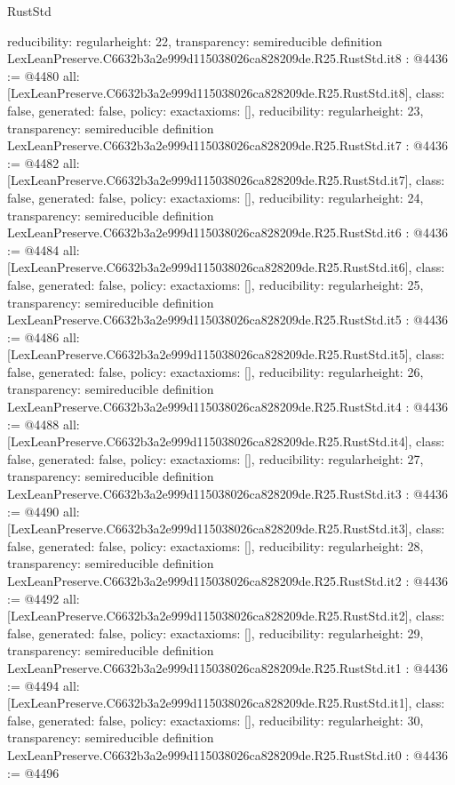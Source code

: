 \begin{lexlean}{RustStd}
\begin{coremodule}
{  reducibility: regular{height: 22},
  transparency: semireducible
}
definition LexLeanPreserve.C6632b3a2e999d115038026ca828209de.R25.RustStd.it8 : @4436 := @4480 {
  all: [LexLeanPreserve.C6632b3a2e999d115038026ca828209de.R25.RustStd.it8],
  class: false,
  generated: false,
  policy: exact{axioms: []},
  reducibility: regular{height: 23},
  transparency: semireducible
}
definition LexLeanPreserve.C6632b3a2e999d115038026ca828209de.R25.RustStd.it7 : @4436 := @4482 {
  all: [LexLeanPreserve.C6632b3a2e999d115038026ca828209de.R25.RustStd.it7],
  class: false,
  generated: false,
  policy: exact{axioms: []},
  reducibility: regular{height: 24},
  transparency: semireducible
}
definition LexLeanPreserve.C6632b3a2e999d115038026ca828209de.R25.RustStd.it6 : @4436 := @4484 {
  all: [LexLeanPreserve.C6632b3a2e999d115038026ca828209de.R25.RustStd.it6],
  class: false,
  generated: false,
  policy: exact{axioms: []},
  reducibility: regular{height: 25},
  transparency: semireducible
}
definition LexLeanPreserve.C6632b3a2e999d115038026ca828209de.R25.RustStd.it5 : @4436 := @4486 {
  all: [LexLeanPreserve.C6632b3a2e999d115038026ca828209de.R25.RustStd.it5],
  class: false,
  generated: false,
  policy: exact{axioms: []},
  reducibility: regular{height: 26},
  transparency: semireducible
}
definition LexLeanPreserve.C6632b3a2e999d115038026ca828209de.R25.RustStd.it4 : @4436 := @4488 {
  all: [LexLeanPreserve.C6632b3a2e999d115038026ca828209de.R25.RustStd.it4],
  class: false,
  generated: false,
  policy: exact{axioms: []},
  reducibility: regular{height: 27},
  transparency: semireducible
}
definition LexLeanPreserve.C6632b3a2e999d115038026ca828209de.R25.RustStd.it3 : @4436 := @4490 {
  all: [LexLeanPreserve.C6632b3a2e999d115038026ca828209de.R25.RustStd.it3],
  class: false,
  generated: false,
  policy: exact{axioms: []},
  reducibility: regular{height: 28},
  transparency: semireducible
}
definition LexLeanPreserve.C6632b3a2e999d115038026ca828209de.R25.RustStd.it2 : @4436 := @4492 {
  all: [LexLeanPreserve.C6632b3a2e999d115038026ca828209de.R25.RustStd.it2],
  class: false,
  generated: false,
  policy: exact{axioms: []},
  reducibility: regular{height: 29},
  transparency: semireducible
}
definition LexLeanPreserve.C6632b3a2e999d115038026ca828209de.R25.RustStd.it1 : @4436 := @4494 {
  all: [LexLeanPreserve.C6632b3a2e999d115038026ca828209de.R25.RustStd.it1],
  class: false,
  generated: false,
  policy: exact{axioms: []},
  reducibility: regular{height: 30},
  transparency: semireducible
}
definition LexLeanPreserve.C6632b3a2e999d115038026ca828209de.R25.RustStd.it0 : @4436 := @4496 {
}
\end{coremodule}
\end{lexlean}
